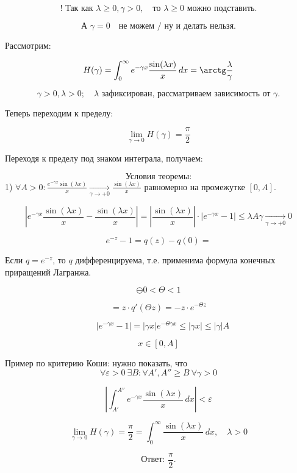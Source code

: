 \documentclass{article}
\begin{document}
\[
! \text{ Так как } \lambda \geq 0, \gamma > 0, \quad \text{то } \lambda \geq 0 \text{ можно подставить.}
\]

\[
\text{А } \gamma = 0 \quad \text{не можем / ну и делать нельзя.}
\]

Рассмотрим:

\[
H(\gamma) = \int_{0}^{\infty} e^{-\gamma x} \frac{\sin(\lambda x)}{x} \, dx = \arctg \frac{\lambda}{\gamma}
\]

\[
\gamma > 0, \lambda > 0; \quad \lambda \text{ зафиксирован, рассматриваем зависимость от } \gamma.
\]

Теперь переходим к пределу:

\[
\lim_{\gamma \to 0} H(\gamma) = \frac{\pi}{2}
\]

Переходя к пределу под знаком интеграла, получаем:

\[
\text{Условия теоремы:}
\]
1) \( \forall A > 0: \frac{e^{-\gamma x} \sin(\lambda x)}{x} \xrightarrow[\gamma \to +0]{} \frac{\sin(\lambda x)}{x} \) равномерно на промежутке \( [0, A] \).

\[
\left| e^{-\gamma x} \frac{\sin(\lambda x)}{x} - \frac{\sin(\lambda x)}{x} \right| = \left| \frac{\sin(\lambda x)}{x} \right| \cdot \left| e^{-\gamma x} - 1 \right| \leq \lambda A \gamma \xrightarrow[\gamma \to +0]{} 0
\]

\[
e^{-z} - 1 = q(z) - q(0) =
\]

Если \( q = e^{-z} \), то \( q \) дифференцируема,
т.е. применима формула конечных приращений Лагранжа.

\[
\ominus 0 < \Theta < 1
\]

\[
= z \cdot q'(\Theta z) = -z \cdot e^{-\Theta z} 
\]

\[
\quad \left| e^{-\gamma x} - 1 \right| = |\gamma x| e^{-\Theta \gamma x} \leq |\gamma x| \leq |\gamma| A
\]

\[
x \in [0, A]
\]


Пример по критерию Коши: нужно показать, что
\[
\forall \varepsilon > 0 \ \exists B :
\forall A', A'' \geq B \ \forall \gamma > 0
\]

\[
\left| \int_{A'}^{A''} e^{-\gamma x} \frac{\sin(\lambda x)}{x} \, dx \right| < \varepsilon
\]

\[
\lim_{\gamma \to 0} H(\gamma) = \frac{\pi}{2} = \int_{0}^{\infty} \frac{\sin(\lambda x)}{x} \, dx, \quad \lambda > 0
\]

\[
\boxed{\text{Ответ: } \frac{\pi}{2}.}
\]
\end{document}
